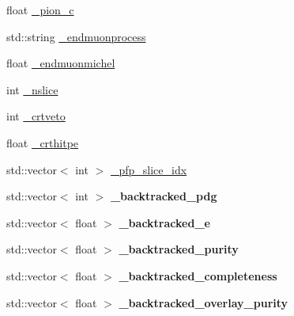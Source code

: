 \begin{DoxyCompactItemize}
\item 
float \hyperlink{classanalysis_1_1DefaultAnalysis_a9978effbcfba62536fc88a73fa985fe9}{\+\_\+pion\+\_\+c}
\item 
std\+::string \hyperlink{classanalysis_1_1DefaultAnalysis_a8cbb24a231e167258d2914f92bc4af22}{\+\_\+endmuonprocess}
\item 
float \hyperlink{classanalysis_1_1DefaultAnalysis_a3797bcb310074825add03ce03175fdc3}{\+\_\+endmuonmichel}
\item 
int \hyperlink{classanalysis_1_1DefaultAnalysis_a3eddf49910782afed7f324755fffe681}{\+\_\+nslice}
\item 
int \hyperlink{classanalysis_1_1DefaultAnalysis_a84ce9904fa527012a65c2be203a38d38}{\+\_\+crtveto}
\item 
float \hyperlink{classanalysis_1_1DefaultAnalysis_a900ec35e3ca4a00d4625a1e632bb6b40}{\+\_\+crthitpe}
\item 
std\+::vector$<$ int $>$ \hyperlink{classanalysis_1_1DefaultAnalysis_acbf0c279993cbefca72f38bc5e9f6627}{\+\_\+pfp\+\_\+slice\+\_\+idx}
\item 
std\+::vector$<$ int $>$ {\bfseries \+\_\+backtracked\+\_\+pdg}\hypertarget{classanalysis_1_1DefaultAnalysis_a28bd59dce75b8fd3be70bd4996354ae9}{}\label{classanalysis_1_1DefaultAnalysis_a28bd59dce75b8fd3be70bd4996354ae9}

\item 
std\+::vector$<$ float $>$ {\bfseries \+\_\+backtracked\+\_\+e}\hypertarget{classanalysis_1_1DefaultAnalysis_a2c16b4988d0bccf8b7ef96a52c173b80}{}\label{classanalysis_1_1DefaultAnalysis_a2c16b4988d0bccf8b7ef96a52c173b80}

\item 
std\+::vector$<$ float $>$ {\bfseries \+\_\+backtracked\+\_\+purity}\hypertarget{classanalysis_1_1DefaultAnalysis_ad08d9b30c434685e350c5f292d4df08b}{}\label{classanalysis_1_1DefaultAnalysis_ad08d9b30c434685e350c5f292d4df08b}

\item 
std\+::vector$<$ float $>$ {\bfseries \+\_\+backtracked\+\_\+completeness}\hypertarget{classanalysis_1_1DefaultAnalysis_a60ef3ec6e332c118c088e0203fb858d6}{}\label{classanalysis_1_1DefaultAnalysis_a60ef3ec6e332c118c088e0203fb858d6}

\item 
std\+::vector$<$ float $>$ {\bfseries \+\_\+backtracked\+\_\+overlay\+\_\+purity}\hypertarget{classanalysis_1_1DefaultAnalysis_a29bf0fc0be5e2beffdacad2ff2e2285e}{}\label{classanalysis_1_1DefaultAnalysis_a29bf0fc0be5e2beffdacad2ff2e2285e}


\end{DoxyCompactItemize}

